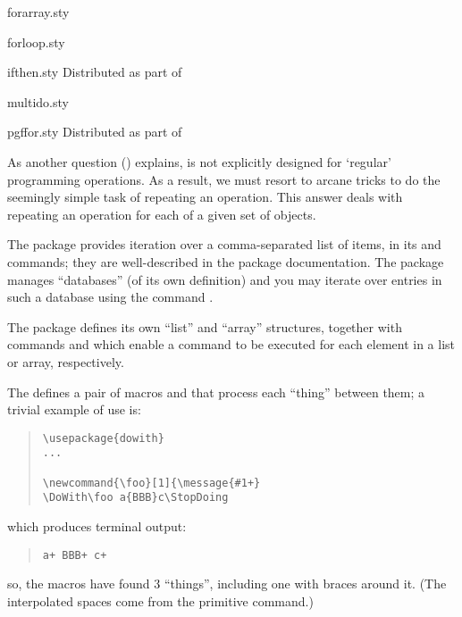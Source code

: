 %
\begin{ctanrefs}
\item[forarray.sty]
\item[forloop.sty]
\item[ifthen.sty]Distributed as part of 
\item[multido.sty]
\item[pgffor.sty]Distributed as part of 
\end{ctanrefs}


As another question %
()
explains, \tex{} is not explicitly designed for `regular' programming
operations. As a result, we must resort to arcane tricks to do the
seemingly simple task of repeating an operation.  This answer deals
with repeating an operation for each of a given set of objects.

The  package provides iteration over a
comma-separated list of items, in its  and
 commands; they are well-described in the package
documentation.  The  package manages ``databases''
(of its own definition) and you may iterate over entries in such a
database using the command .

The  package defines its own ``list'' and ``array''
structures, together with commands  and 
which enable a command to be executed for each element in a list or
array, respectively.

The  defines a pair of macros  and
 that process each ``thing'' between them; a trivial
example of use is:
\begin{quote}
\begin{verbatim}
\usepackage{dowith}
...

\newcommand{\foo}[1]{\message{#1+}
\DoWith\foo a{BBB}c\StopDoing
\end{verbatim}
\end{quote}
which produces terminal output:
\begin{quote}
\begin{verbatim}
a+ BBB+ c+
\end{verbatim}
\end{quote}
so, the macros have found 3 ``things'', including one with braces
around it.  (The interpolated spaces come from the primitive
 command.)


